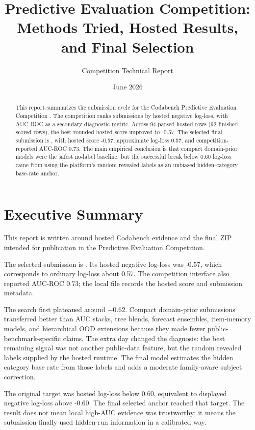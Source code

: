 \documentclass[11pt]{article}
\title{Predictive Evaluation Competition: Methods Tried, Hosted Results, and Final Selection}
\author{Competition Technical Report}
\date{June 2026}
\begin{document}
\maketitle

\begin{abstract}
This report summarizes the submission cycle for the Codabench Predictive Evaluation Competition \cite{codabench_competition}. The competition ranks submissions by hosted negative log-loss, with AUC-ROC as a secondary diagnostic metric. Across 94 parsed hosted rows (92 finished scored rows), the best rounded hosted score improved to -0.57. The selected final submission is , with hosted score -0.57, approximate log-loss 0.57, and competition-reported AUC-ROC 0.73. The main empirical conclusion is that compact domain-prior models were the safest no-label baseline, but the successful break below 0.60 log-loss came from using the platform's random revealed labels as an unbiased hidden-category base-rate anchor.
\end{abstract}

\section{Executive Summary}
This report is written around hosted Codabench evidence and the final ZIP intended for publication in the Predictive Evaluation Competition.

The selected submission is . Its hosted negative log-loss was -0.57, which corresponds to ordinary log-loss about 0.57. The competition interface also reported AUC-ROC 0.73; the local  file records the hosted score and submission metadata.

The search first plateaued around \(-0.62\). Compact domain-prior submissions transferred better than AUC stacks, tree blends, forecast ensembles, item-memory models, and hierarchical OOD extensions because they made fewer public-benchmark-specific claims. The extra day changed the diagnosis: the best remaining signal was not another public-data feature, but the random revealed labels supplied by the hosted runtime. The final model estimates the hidden category base rate from those labels and adds a moderate family-aware subject correction.

The original target was hosted log-loss below 0.60, equivalent to displayed negative log-loss above -0.60. The final selected anchor reached that target. The result does not mean local high-AUC evidence was trustworthy; it means the submission finally used hidden-run information in a calibrated way.
\end{document}
